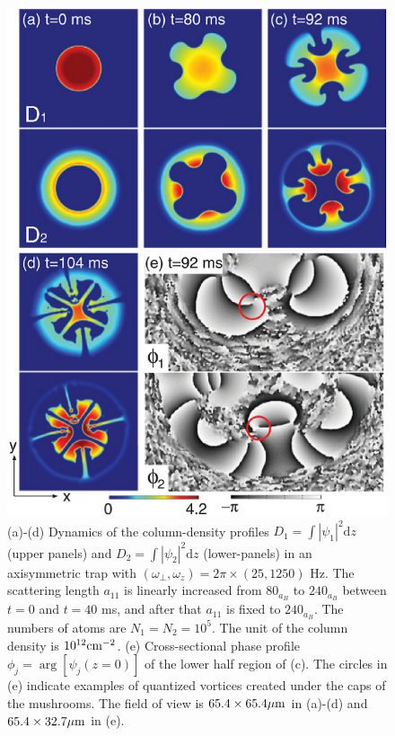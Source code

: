 \documentclass[12pt,a4paper]{report} %
\newcommand{\diff}{\mathrm{d}}				%
\begin{document}
\begin{figure}[htbp]
\begin{center}
\includegraphics[scale=0.5,keepaspectratio]{5-1.eps}
\caption{(a)-(d) Dynamics of the column-density
profiles $D_1 = \int |\psi_1|^2 \diff z$(upper panels) and
$D_2 = \int |\psi_2|^2 \diff z$ (lower-panels) in an axisymmetric trap with
$( \omega_\perp , \omega_z ) = 2 \pi \times (25, 1250)$ Hz.
The scattering length $a_{11}$ is linearly increased from $80_{a_B}$ to $240_{a_B}$
between $t=0$ and $t=40$ ms, and after that $a_{11}$ is fixed to $240_{a_B}$.
The numbers of atoms are $N_1 = N_2 = 10^5$. The unit of the column density
is $10^{12} {\rm cm}^{-2}$. (e) Cross-sectional phase profile $\phi_j = \arg [\psi_j(z=0)]$
of the lower half region of (c). The circles in (e) indicate examples
of quantized vortices created under the caps of the mushrooms. The
field of view is $65.4 \times 65.4 {\rm \mu m}$ in (a)-(d) and $65.4 \times 32.7 {\rm \mu m}$ in (e).}
\label{FIG:5-1}
\end{center}
\end{figure}
\end{document}
